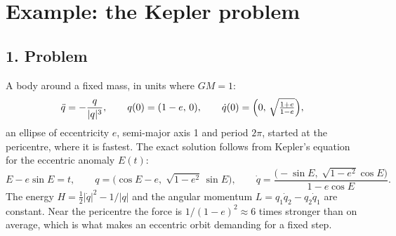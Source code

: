 \documentclass[11pt,a4paper]{article}
\begin{document}
\section*{Example: the Kepler problem}

\subsection*{1. Problem}
A body around a fixed mass, in units where $GM = 1$:
\begin{equation*}
  \ddot q = -\frac{q}{|q|^3}, \qquad
  q(0) = (1 - e,\, 0), \qquad
  \dot q(0) = \Bigl(0,\, \sqrt{\tfrac{1 + e}{1 - e}}\Bigr),
\end{equation*}
an ellipse of eccentricity $e$, semi-major axis 1 and period $2\pi$, started at
the pericentre, where it is fastest. The exact solution follows from Kepler's
equation for the eccentric anomaly $E(t)$:
\begin{equation*}
  E - e \sin E = t, \qquad
  q = \bigl(\cos E - e,\; \sqrt{1 - e^2}\,\sin E\bigr), \qquad
  \dot q = \frac{\bigl(-\sin E,\; \sqrt{1 - e^2}\cos E\bigr)}{1 - e\cos E} .
\end{equation*}
The energy $H = \tfrac12|\dot q|^2 - 1/|q|$ and the angular momentum
$L = q_1\dot q_2 - q_2\dot q_1$ are constant. Near the pericentre the force is
$1/(1 - e)^2 \approx 6$ times stronger than on average, which is what makes an
eccentric orbit demanding for a fixed step.
\begin{center}
\small

\end{center}
\end{document}
